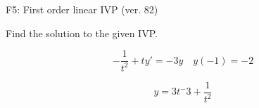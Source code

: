 \begin{exercise}
  \begin{exerciseTitle}F5: First order linear IVP (ver. 82)\end{exerciseTitle}
  \begin{exerciseStatement}
    
Find the solution to the given IVP.

    
\[-\frac{1}{t^{2}} +ty'= -3 y \hspace{1em} y( -1 ) = -2\]

  \end{exerciseStatement}
  \begin{exerciseAnswer}
    
\[y= 3 t^ -3 + \frac{1}{t^{2}}\]

  \end{exerciseAnswer}
\end{exercise}